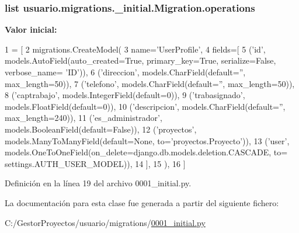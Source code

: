 \subsubsection[{\texorpdfstring{operations}{operations}}]{\setlength{\rightskip}{0pt plus 5cm}list usuario.\+migrations.\+\_\+initial.\+Migration.\+operations\hspace{0.3cm}{\ttfamily [static]}}\hypertarget{classusuario_1_1migrations_1_10001__initial_1_1_migration_a1b1e2cc8f6749112d5582bb47942df78}{}\label{classusuario_1_1migrations_1_10001__initial_1_1_migration_a1b1e2cc8f6749112d5582bb47942df78}
{\bfseries Valor inicial\+:}
\begin{DoxyCode}
1 = [
2         migrations.CreateModel(
3             name=\textcolor{stringliteral}{'UserProfile'},
4             fields=[
5                 (\textcolor{stringliteral}{'id'}, models.AutoField(auto\_created=\textcolor{keyword}{True}, primary\_key=\textcolor{keyword}{True}, serialize=\textcolor{keyword}{False}, verbose\_name=\textcolor{stringliteral}{
      'ID'})),
6                 (\textcolor{stringliteral}{'direccion'}, models.CharField(default=\textcolor{stringliteral}{''}, max\_length=50)),
7                 (\textcolor{stringliteral}{'telefono'}, models.CharField(default=\textcolor{stringliteral}{''}, max\_length=50)),
8                 (\textcolor{stringliteral}{'captrabajo'}, models.IntegerField(default=0)),
9                 (\textcolor{stringliteral}{'trabasignado'}, models.FloatField(default=0)),
10                 (\textcolor{stringliteral}{'descripcion'}, models.CharField(default=\textcolor{stringliteral}{''}, max\_length=240)),
11                 (\textcolor{stringliteral}{'es\_administrador'}, models.BooleanField(default=\textcolor{keyword}{False})),
12                 (\textcolor{stringliteral}{'proyectos'}, models.ManyToManyField(default=\textcolor{keywordtype}{None}, to=\textcolor{stringliteral}{'proyectos.Proyecto'})),
13                 (\textcolor{stringliteral}{'user'}, models.OneToOneField(on\_delete=django.db.models.deletion.CASCADE, to=
      settings.AUTH\_USER\_MODEL)),
14             ],
15         ),
16     ]
\end{DoxyCode}


Definición en la línea 19 del archivo 0001\+\_\+initial.\+py.



La documentación para esta clase fue generada a partir del siguiente fichero\+:\begin{DoxyCompactItemize}
\item 
C\+:/\+Gestor\+Proyectos/usuario/migrations/\hyperlink{usuario_2migrations_20001__initial_8py}{0001\+\_\+initial.\+py}\end{DoxyCompactItemize}
